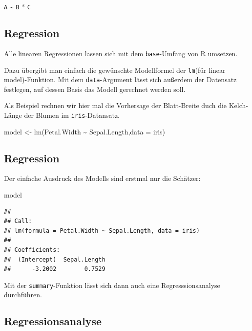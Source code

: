 \documentclass[
]{book}
\newenvironment{Shaded}{\begin{snugshade}}{\end{snugshade}}
\newcommand{\AttributeTok}[1]{\textcolor[rgb]{0.77,0.63,0.00}{#1}}
\newcommand{\FunctionTok}[1]{\textcolor[rgb]{0.00,0.00,0.00}{#1}}
\newcommand{\NormalTok}[1]{#1}
\newcommand{\OtherTok}[1]{\textcolor[rgb]{0.56,0.35,0.01}{#1}}
\newcommand{\SpecialCharTok}[1]{\textcolor[rgb]{0.00,0.00,0.00}{#1}}
\begin{document}
\texttt{A} \textasciitilde{} \texttt{B} * \texttt{C}

\hypertarget{regression}{%
\subsection{Regression}\label{regression}}

Alle linearen Regressionen lassen sich mit dem \texttt{base}-Umfang von R umsetzen.

Dazu übergibt man einfach die gewünschte Modellformel der \texttt{lm}(für linear model)-Funktion. Mit dem \texttt{data}-Argument lässt sich außerdem der Datensatz festlegen, auf dessen Basis das Modell gerechnet werden soll.

Als Beispiel rechnen wir hier mal die Vorhersage der Blatt-Breite duch die Kelch-Länge der Blumen im \texttt{iris}-Datansatz.

\begin{Shaded}
\begin{Highlighting}[]
\NormalTok{model }\OtherTok{\textless{}{-}} \FunctionTok{lm}\NormalTok{(Petal.Width }\SpecialCharTok{\textasciitilde{}}\NormalTok{ Sepal.Length,}\AttributeTok{data =}\NormalTok{ iris)}
\end{Highlighting}
\end{Shaded}

\hypertarget{regression-1}{%
\subsection{Regression}\label{regression-1}}

Der einfache Ausdruck des Modells sind erstmal nur die Schätzer:

\begin{Shaded}
\begin{Highlighting}[]
\NormalTok{model}
\end{Highlighting}
\end{Shaded}

\begin{verbatim}
## 
## Call:
## lm(formula = Petal.Width ~ Sepal.Length, data = iris)
## 
## Coefficients:
##  (Intercept)  Sepal.Length  
##      -3.2002        0.7529
\end{verbatim}

Mit der \texttt{summary}-Funktion lässt sich dann auch eine Regresssionsanalyse durchführen.

\hypertarget{regressionsanalyse}{%
\subsection{Regressionsanalyse}\label{regressionsanalyse}}
\end{document}
